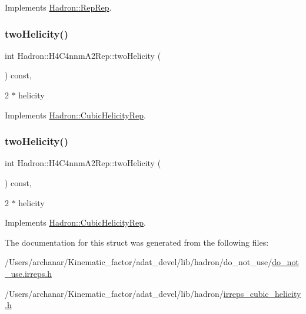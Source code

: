 Implements \mbox{\hyperlink{structHadron_1_1RepRep_ab3213025f6de249f7095892109575fde}{Hadron\+::\+Rep\+Rep}}.

\mbox{\label{structHadron_1_1H4C4nnmA2Rep_ab2b49f0e189eae4dc52cb9ab1d7f9b11}} 
\subsubsection{\texorpdfstring{twoHelicity()}{twoHelicity()}\hspace{0.1cm}{\footnotesize\ttfamily [1/2]}}
{\footnotesize\ttfamily int Hadron\+::\+H4\+C4nnm\+A2\+Rep\+::two\+Helicity (\begin{DoxyParamCaption}{ }\end{DoxyParamCaption}) const\hspace{0.3cm}{\ttfamily [inline]}, {\ttfamily [virtual]}}

2 $\ast$ helicity 

Implements \mbox{\hyperlink{structHadron_1_1CubicHelicityRep_af507aa56fc2747eacc8cb6c96db31ecc}{Hadron\+::\+Cubic\+Helicity\+Rep}}.

\mbox{\label{structHadron_1_1H4C4nnmA2Rep_ab2b49f0e189eae4dc52cb9ab1d7f9b11}} 
\subsubsection{\texorpdfstring{twoHelicity()}{twoHelicity()}\hspace{0.1cm}{\footnotesize\ttfamily [2/2]}}
{\footnotesize\ttfamily int Hadron\+::\+H4\+C4nnm\+A2\+Rep\+::two\+Helicity (\begin{DoxyParamCaption}{ }\end{DoxyParamCaption}) const\hspace{0.3cm}{\ttfamily [inline]}, {\ttfamily [virtual]}}

2 $\ast$ helicity 

Implements \mbox{\hyperlink{structHadron_1_1CubicHelicityRep_af507aa56fc2747eacc8cb6c96db31ecc}{Hadron\+::\+Cubic\+Helicity\+Rep}}.



The documentation for this struct was generated from the following files\+:\begin{DoxyCompactItemize}
\item 
/\+Users/archanar/\+Kinematic\+\_\+factor/adat\+\_\+devel/lib/hadron/do\+\_\+not\+\_\+use/\mbox{\hyperlink{do__not__use_8irreps_8h}{do\+\_\+not\+\_\+use.\+irreps.\+h}}\item 
/\+Users/archanar/\+Kinematic\+\_\+factor/adat\+\_\+devel/lib/hadron/\mbox{\hyperlink{lib_2hadron_2irreps__cubic__helicity_8h}{irreps\+\_\+cubic\+\_\+helicity.\+h}}\end{DoxyCompactItemize}
